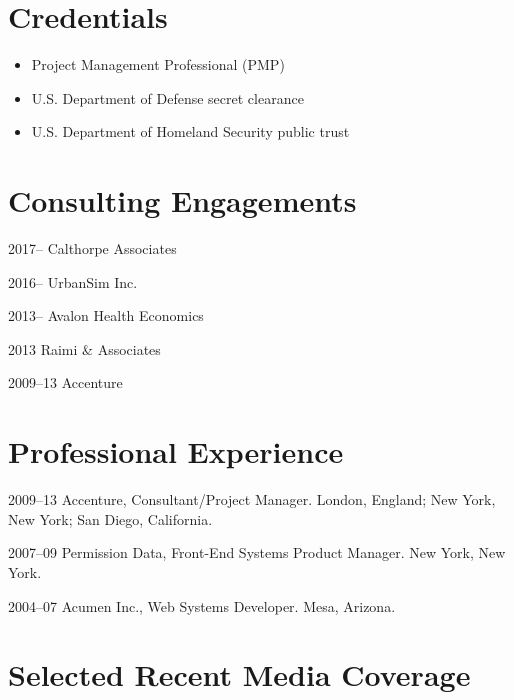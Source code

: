 \documentclass{academiccv}
\begin{document}
\section*{Credentials}

\begin{itemize}
\item Project Management Professional (PMP)
\item U.S. Department of Defense secret clearance
\item U.S. Department of Homeland Security public trust
\end{itemize}



\section*{Consulting Engagements}

\begin{tablist}
\item[2017--]   \tab Calthorpe Associates
\item[2016--]   \tab UrbanSim Inc.
\item[2013--]   \tab Avalon Health Economics
\item[2013]     \tab Raimi \& Associates
\item[2009--13] \tab Accenture
\end{tablist}



\section*{Professional Experience}

\begin{tablist}

\item[2009--13] \tab Accenture, Consultant/Project Manager. London, England; New York, New York; San Diego, California.

\item[2007--09] \tab Permission Data, Front-End Systems Product Manager. New York, New York.

\item[2004--07] \tab Acumen Inc., Web Systems Developer. Mesa, Arizona.
\end{tablist}



\section*{Selected Recent Media Coverage}
\end{document}
